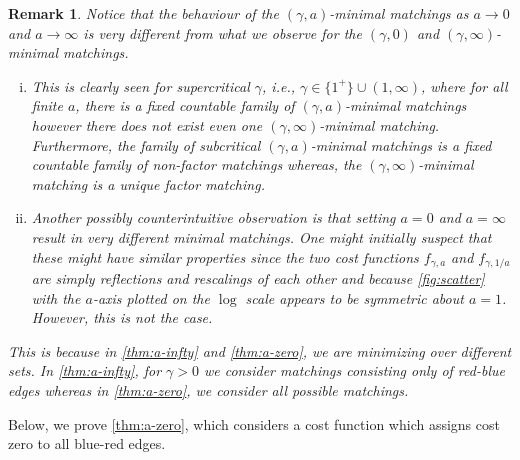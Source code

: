 \documentclass{article}
\newtheorem{remark}{Remark}
\begin{document}
\begin{remark} \label{rem:lims}
  Notice that the behaviour of the $(\gamma,a)$-minimal matchings as
  $a\rightarrow 0$ and $a\rightarrow\infty$ is very different from
  what we observe for
  the $(\gamma,0)$ and $(\gamma,\infty)$-minimal matchings.
  \begin{enumerate}[(i)]
\item   This is clearly seen for supercritical $\gamma$, i.e.,
$\gamma\in\{1^+\}\cup(1,\infty)$, where for all finite $a$, there is a
fixed countable family of $(\gamma,a)$-minimal matchings however there does not
exist even one $(\gamma,\infty)$-minimal matching. Furthermore, the
family of subcritical $(\gamma,a)$-minimal matchings is a fixed countable
family of non-factor matchings whereas, the $(\gamma,\infty)$-minimal
matching is a unique factor matching.
\item Another possibly counterintuitive observation is that  setting
  $a=0$ and $a=\infty$ result in very different minimal matchings.
  One might initially suspect that these might have
similar properties since the two cost functions $f_{\gamma,a}$ and
$f_{\gamma,1/a}$ are simply reflections and rescalings of each other and
because \cref{fig:scatter} with the $a$-axis plotted on the $\log$ scale
appears to be symmetric about $a=1$.
However, this is not the case.
\end{enumerate}
This is because in
\cref{thm:a-infty} and \cref{thm:a-zero}, we are minimizing over
different sets. In \cref{thm:a-infty}, for $\gamma>0$ we consider matchings
consisting only of red-blue edges whereas in \cref{thm:a-zero}, we
consider all possible matchings.
\end{remark}


Below, we prove \cref{thm:a-zero}, which considers a cost function
which assigns cost zero to all blue-red edges.
\end{document}
